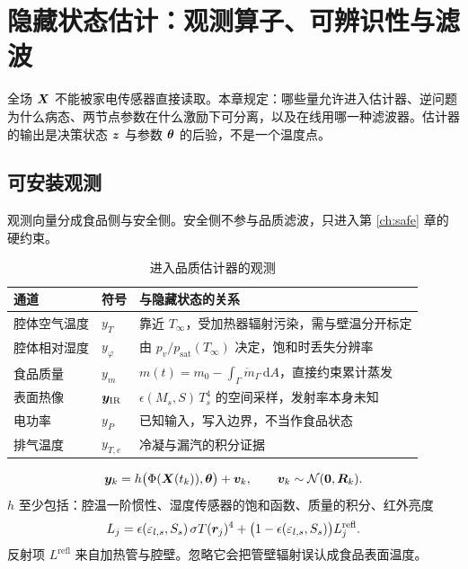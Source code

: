 \chapter{隐藏状态估计：观测算子、可辨识性与滤波}
\label{ch:est}

全场 $\bm{X}$ 不能被家电传感器直接读取。本章规定：哪些量允许进入估计器、逆问题为什么病态、两节点参数在什么激励下可分离，以及在线用哪一种滤波器。估计器的输出是决策状态 $\bm{z}$ 与参数 $\bm{\theta}$ 的后验，不是一个温度点。

\section{可安装观测}

观测向量分成食品侧与安全侧。安全侧不参与品质滤波，只进入第 \ref{ch:safe} 章的硬约束。

\begin{table}[H]
\centering
\caption{进入品质估计器的观测}
\begin{tabularx}{\textwidth}{llX}
\toprule
通道 & 符号 & 与隐藏状态的关系 \\
\midrule
腔体空气温度 & $y_T$ & 靠近 $T_\infty$，受加热器辐射污染，需与壁温分开标定 \\
腔体相对湿度 & $y_\varphi$ & 由 $p_v/p_{\mathrm{sat}}(T_\infty)$ 决定，饱和时丢失分辨率 \\
食品质量 & $y_m$ & $m(t)=m_0-\int_\Gamma \dot m_\Gamma\,\mathrm{d}A$，直接约束累计蒸发 \\
表面热像 & $\bm{y}_{\mathrm{IR}}$ & $\epsilon(M_s,S)\,T_s^4$ 的空间采样，发射率本身未知 \\
电功率 & $y_P$ & 已知输入，写入边界，不当作食品状态 \\
排气温度 & $y_{T,e}$ & 冷凝与漏汽的积分证据 \\
\bottomrule
\end{tabularx}
\end{table}

\begin{definition}[观测方程]
\begin{equation}
\label{eq:obs}
\bm{y}_k=h\big(\Phi(\bm{X}(t_k)),\bm{\theta}\big)+\bm{v}_k,
\qquad \bm{v}_k\sim\mathcal{N}(\bm{0},\bm{R}_k).
\end{equation}
$h$ 至少包括：腔温一阶惯性、湿度传感器的饱和函数、质量的积分、红外亮度
\begin{equation}
\label{eq:ir}
L_j=\epsilon(\varepsilon_{l,s},S_s)\,\sigma T(\bm{r}_j)^4
+\big(1-\epsilon(\varepsilon_{l,s},S_s)\big)L_j^{\mathrm{refl}}.
\end{equation}
反射项 $L^{\mathrm{refl}}$ 来自加热管与腔壁。忽略它会把管壁辐射误认成食品表面温度。
\end{definition}

